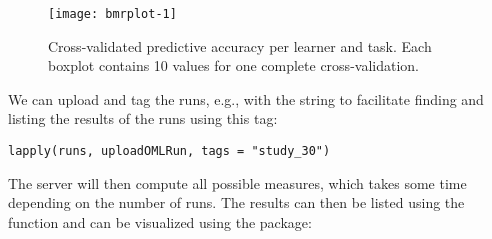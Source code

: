 \begin{knitrout}\small
{}\color{fgcolor}\begin{figure}[!h]

{\centering \texttt{[image: bmrplot-1]} 

}

\caption[Cross-validated predictive accuracy per learner and task]{Cross-validated predictive accuracy per learner and task. Each boxplot contains 10 values for one complete cross-validation.}\label{fig:bmrplot}
\end{figure}


\end{knitrout}

We can upload and tag the runs, e.g., with the string 
to facilitate finding and listing the results of the runs using this tag:

\begin{knitrout}\small
{}\color{fgcolor}\begin{kframe}
\begin{verbatim}
lapply(runs, uploadOMLRun, tags = "study_30")
\end{verbatim}
\end{kframe}
\end{knitrout}

The server will then compute all possible measures, which takes some time
depending on the number of runs.
The results can then be listed using the  function
and can be visualized using the  package: %

